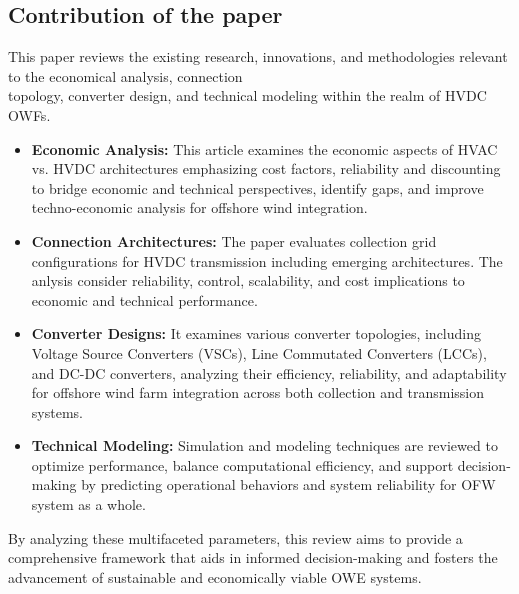 \documentclass{ieeeaccess}
\begin{document}
\subsection{\textbf{Contribution of the paper}}

This paper reviews the existing research, innovations, and methodologies relevant to the economical analysis, connection\\ topology, converter design, and technical modeling within the realm of HVDC OWFs.
 \begin{itemize}
\item \textbf{Economic Analysis:} This article examines the economic aspects of HVAC vs. HVDC architectures emphasizing cost factors, reliability and discounting to bridge economic and technical perspectives, identify gaps, and improve techno-economic analysis for offshore wind integration. 
\item \textbf{Connection Architectures:} The paper evaluates collection grid configurations for HVDC transmission including emerging architectures. 
The anlysis consider reliability, control, scalability, and cost implications to economic and technical performance.
\item \textbf{Converter Designs:} It examines various converter topologies, including Voltage Source Converters (VSCs), Line Commutated Converters (LCCs), and DC-DC converters, analyzing their efficiency, reliability, and adaptability for offshore wind farm integration across both collection and transmission systems. 
\item \textbf{Technical Modeling:} Simulation and modeling techniques are reviewed to optimize performance, balance computational efficiency, and support decision-making by predicting operational behaviors and system reliability for OFW system as a whole. \end{itemize}
By analyzing these multifaceted parameters, this review aims to provide a comprehensive framework that aids in informed decision-making and fosters the advancement of sustainable and economically viable OWE systems. 
\end{document}
